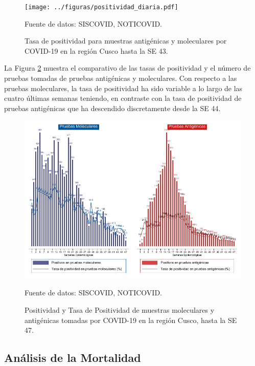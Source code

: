 \documentclass[12pt,a4paper,openany]{book}
\begin{document}
  
   
   \begin{figure}[h]
   	\caption{Tasa de positividad para muestras antigénicas y moleculares por COVID-19 en la región Cusco hasta la SE 43. }\label{fig:total_muestras_procesada}
   	\begin{center}
   		\texttt{[image: ../figuras/positividad\_diaria.pdf]}
   	\end{center}
   	{\footnotesize {Fuente de datos: SISCOVID, NOTICOVID.}}
   \end{figure}



La Figura \ref{fig:positividad_ambas} muestra el comparativo de las tasas de positividad y el número de pruebas tomadas de pruebas antigénicas y moleculares. Con respecto a las pruebas moleculares, la tasa de positividad ha sido variable a lo largo de las cuatro últimas semanas teniendo, en contraste con la tasa de positividad de pruebas antigénicas que ha descendido discretamente desde la SE 44.  

\begin{landscape}
   \begin{figure}[h]
	\caption{Positividad y Tasa de Positividad de muestras moleculares y antigénicas tomadas por COVID-19 en la región Cusco, hasta la SE 47. }\label{fig:positividad_ambas}
   	\begin{center}
   		\includegraphics[width=0.85\linewidth]{../figuras/positividad_ambas.pdf}
   	\end{center}
   	{\footnotesize {Fuente de datos: SISCOVID, NOTICOVID.}}
   \end{figure}
\end{landscape}
\clearpage

	\subsection*{Análisis de la Mortalidad}
\end{document}

